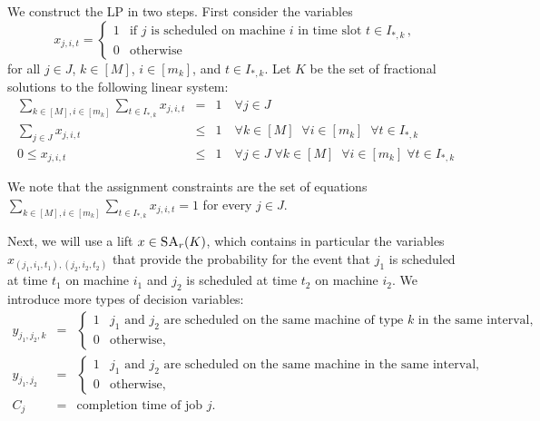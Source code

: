   
  We construct the LP in two steps.
  First consider the variables
  \[
    x_{j,i,t} = \begin{cases} 1 & \textrm{if }j\textrm{ is scheduled on machine }i\textrm{ in time slot }t \in I_{*,k} \,, \\ 0 & \textrm{otherwise} \end{cases}
  \]
  for all $j \in J$, $k \in [M]$, $i \in [m_k]$, and $t \in I_{*,k}$.
  Let $K$ be the set of fractional solutions to the following linear system:
  \begin{eqnarray*}
    \sum_{k \in [M], i \in [m_k]} \sum_{t \in I_{*,k}} x_{j,i,t} &=& 1 \quad \forall j \in J \\
    \sum_{j \in J} x_{j,i,t} &\leq& 1 \quad \forall k \in [M] \;\; \forall i \in [m_k] \;\; \forall t \in I_{*,k} \\
    0 \leq x_{j,i,t} &\leq& 1 \quad \forall j \in J \; \forall k \in [M] \; \; \forall i \in [m_k] \; \forall t \in I_{*,k}
  \end{eqnarray*}
  
  
  We note that the assignment constraints are the set of equations 
  $\sum_{k \in [M], i \in [m_k]} \sum_{t \in I_{*,k}} x_{j,i,t} = 1$ for every $j \in J$.
  
  Next, we will use a lift $x \in \textsc{SA}_r(K)$, which contains in particular the variables
  $x_{(j_1,i_1,t_1),(j_2,i_2,t_2)}$ that provide the probability for the event that $j_1$ is scheduled at time $t_1$ on machine $i_1$ and
  $j_2$ is scheduled at time $t_2$ on machine $i_2$.
  We introduce more types of decision variables: 
  \begin{eqnarray*}
    y_{j_1,j_2,k} &=& \begin{cases} 1 & j_1\textrm{ and }j_2\textrm{ are scheduled on the same machine of type $k$ in the same interval,} \\ 0 & \textrm{otherwise,} \end{cases} \\
    y_{j_1,j_2} &=& \begin{cases} 1 & j_1\textrm{ and }j_2\textrm{ are scheduled on the same machine in the same interval,} \\ 0 & \textrm{otherwise,} \end{cases} \\
     C_j &=& \textrm{completion time of job }j.
  \end{eqnarray*}
  
